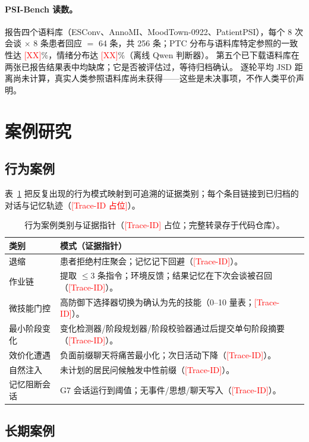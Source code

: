 \documentclass[11pt,a4paper]{article}
\newcommand{\ph}[1]{\textcolor{red}{[#1]}}
\newcommand{\sys}{MoodTown}
\begin{document}
\paragraph{PSI-Bench 读数。}
报告四个语料库（ESConv、AnnoMI、\sys-0922、PatientPSI），每个 8 次会谈 $\times$ 8 条患者回应 $=$ 64 条，共 256 条；PTC 分布与语料库特定参照的一致性达 \ph{XX}\%，情绪分布达 \ph{XX}\%（离线 Qwen 判断器）。
第五个已下载语料库在两张已报告结果表中均缺席；它是否被评估过，等待归档确认。
逐轮平均 JSD 距离尚未计算，真实人类参照语料库尚未获得——这些是未决事项，不作人类平价声明。

\section{案例研究}\label{app:cases}

\subsection{行为案例}

表~\ref{tab:cases} 把反复出现的行为模式映射到可追溯的证据类别；每个条目链接到已归档的对话与记忆轨迹（\ph{Trace-ID 占位}）。

\begin{table}[h]
\centering
\caption{行为案例类别与证据指针（\ph{Trace-ID} 占位；完整转录存于代码仓库）。}
\label{tab:cases}
\small
\begin{tabular}{@{}lp{10.2cm}@{}}
\toprule
类别 & 模式（证据指针） \\
\midrule
退缩 & 患者拒绝村庄聚会；记忆记下回避（\ph{Trace-ID}）。 \\
作业链 & 提取 $\le$3 条指令；环境反馈；结果记忆在下次会谈被召回（\ph{Trace-ID}）。 \\
微技能门控 & 高防御下选择器切换为确认为先的技能（0--10 量表；\ph{Trace-ID}）。 \\
最小阶段变化 & 变化检测器/阶段规划器/阶段校验器通过后提交单句阶段摘要（\ph{Trace-ID}）。 \\
效价化遭遇 & 负面前缀聊天将痛苦最小化；次日活动下降（\ph{Trace-ID}）。 \\
自然注入 & 未计划的居民问候触发中性前缀（\ph{Trace-ID}）。 \\
记忆阻断会话 & G7 会话运行到阈值；无事件/思想/聊天写入（\ph{Trace-ID}）。 \\
\bottomrule
\end{tabular}
\end{table}

\subsection{长期案例}
\end{document}
